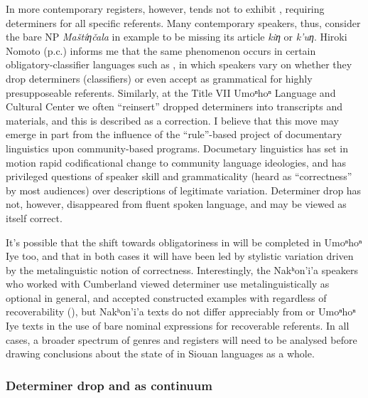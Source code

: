 \documentclass[output=paper]{LSP/langsci}
\begin{document}
In more contemporary registers, however,  tends not to exhibit , requiring determiners for all specific referents. Many contemporary speakers, thus, consider the bare NP \emph{Maštíƞčala} in example  to be missing its article \emph{kiƞ} or \emph{k’uƞ}. Hiroki Nomoto (p.c.) informs me that the same phenomenon occurs in certain obligatory-classifier languages such as , in which speakers vary on whether they drop determiners (classifiers) or even accept  as grammatical for highly presupposeable referents. Similarly, at the Title VII Umoⁿhoⁿ Language and Cultural Center we often “reinsert” dropped determiners into transcripts and materials, and this is described as a correction. I believe that this move may emerge in part from the influence of the “rule”-based project of documentary linguistics upon community-based programs. Documetary linguistics has set in motion rapid codificational change to community language ideologies, and has privileged questions of speaker skill and grammaticality (heard as “correctness” by most audiences) over descriptions of legitimate variation. Determiner drop has not, however, disappeared from fluent spoken language, and may be viewed as itself correct.

	It’s possible that the shift towards obligatoriness in  will be completed in Umoⁿhoⁿ Iye too, and that in both cases it will have been led by stylistic variation driven by the metalinguistic notion of correctness. Interestingly, the Nakʰon’i’a speakers who worked with Cumberland viewed determiner use metalinguistically as optional in general, and accepted constructed examples with  regardless of recoverability (\citealt[345]{Cumberland2005}), but Nakʰon’i’a texts do not differ appreciably from  or Umoⁿhoⁿ Iye texts in the use of bare nominal expressions for recoverable referents. In all cases, a broader spectrum of genres and registers will need to be analysed before drawing conclusions about the state of  in Siouan languages as a whole.

\subsubsection{Determiner drop and  as continuum}\label{dropincorp}
\end{document}
